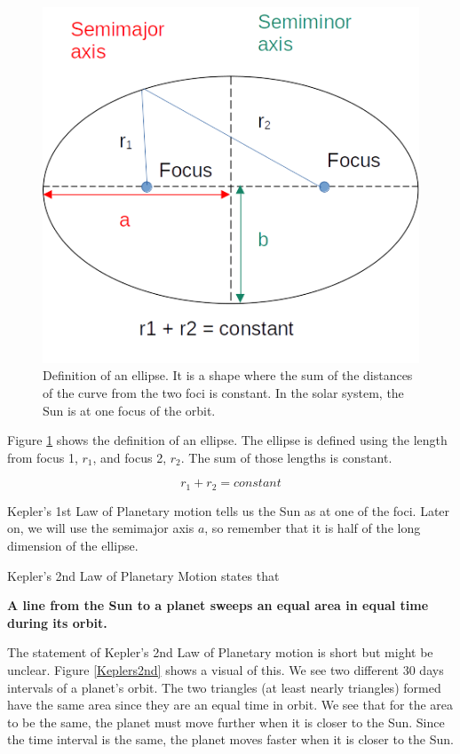 \documentclass[12pt]{book}
\begin{document}
\begin{figure}[H]
\centering
\includegraphics[scale=0.8]{EllipseDef.png}
\caption{Definition of an ellipse. It is a shape where the sum of the distances of the curve from the two foci is constant. In the solar system, the Sun is at one focus of the orbit.}
\label{ellipsedef}
\end{figure}

Figure \ref{ellipsedef} shows the definition of an ellipse. The ellipse is defined using the length from focus 1, $r_1$, and focus 2, $r_2$. The sum of those lengths is constant.

\begin{equation}
r_1 + r_2 = constant
\end{equation}

Kepler's 1st Law of Planetary motion tells us the Sun as at one of the foci. Later on, we will use the semimajor axis $a$, so remember that it is half of the long dimension of the ellipse.

\linespace

Kepler's 2nd Law of Planetary Motion states that

\textbf{A line from the Sun to a planet sweeps an equal area in equal time during its orbit.}

\linespace

The statement of Kepler's 2nd Law of Planetary motion is short but might be unclear. Figure \ref{Keplers2nd} shows a visual of this. We see two different 30 days intervals of a planet's orbit. The two triangles (at least nearly triangles) formed have the same area since they are an equal time in orbit. We see that for the area to be the same, the planet must move further when it is closer to the Sun. Since the time interval is the same, the planet moves faster when it is closer to the Sun.
\end{document}

